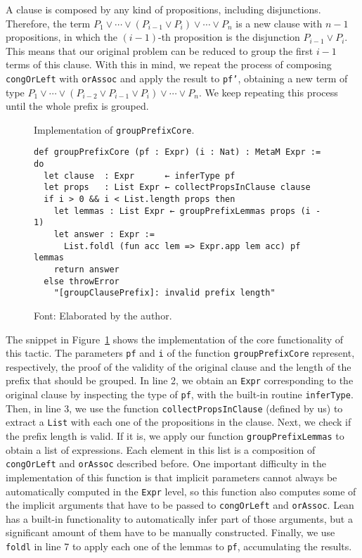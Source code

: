 A clause is composed by any kind of propositions, including disjunctions.
Therefore, the term $P_{1} \vee \cdots \vee (P_{i - 1} \vee P_{i}) \vee \cdots \vee P_{n}$ is a new clause
with $n - 1$ propositions, in which the $(i - 1)$-th proposition is the disjunction
$P_{i - 1} \vee P_{i}$. This means that our original problem can be reduced to
group the first $i - 1$ terms of this clause.
With this in mind, we repeat the process of composing \texttt{congOrLeft} with
\texttt{orAssoc} and apply the result to \texttt{pf'}, obtaining
a new term of type $P_{1} \vee \cdots \vee (P_{i - 2} \vee P_{i - 1} \vee P_{i}) \vee \cdots \vee P_{n}$.
We keep repeating this process until the whole prefix is grouped.


\begin{figure}[t]
\caption{Implementation of \texttt{groupPrefixCore}.}\label{groupClause}
\begin{verbatim}
def groupPrefixCore (pf : Expr) (i : Nat) : MetaM Expr := do
  let clause  : Expr      ← inferType pf
  let props   : List Expr ← collectPropsInClause clause
  if i > 0 && i < List.length props then
    let lemmas : List Expr ← groupPrefixLemmas props (i - 1)
    let answer : Expr :=
      List.foldl (fun acc lem => Expr.app lem acc) pf lemmas
    return answer
  else throwError
    "[groupClausePrefix]: invalid prefix length"
\end{verbatim}
\caption*{Font: Elaborated by the author.}
\end{figure}

The snippet in Figure~\ref{groupClause} shows the
implementation of the core functionality of this tactic.
The parameters \texttt{pf} and \texttt{i} of the function \texttt{groupPrefixCore}
represent, respectively, the proof of the validity of the original clause
and the length of the prefix that should be grouped. In line 2, we obtain
an \texttt{Expr} corresponding to the original clause by inspecting the type
of \texttt{pf}, with the built-in routine \texttt{inferType}. Then, in line 3,
we use the function \texttt{collectPropsInClause} (defined by us) to
extract a \texttt{List} with each one of the propositions in the clause.
Next, we check if the prefix length is valid. If it is, we apply our function
\texttt{groupPrefixLemmas} to obtain a list of expressions. Each element in this list
is a composition of \texttt{congOrLeft} and \texttt{orAssoc} described before.
One important difficulty in the implementation of this function is that implicit parameters cannot always be automatically computed in the \texttt{Expr} level, so
this function also computes some of the implicit arguments that have to be
passed to \texttt{congOrLeft} and \texttt{orAssoc}. Lean has a built-in
functionality to automatically infer part of those arguments, but a significant
amount of them have to be manually constructed.
Finally, we use \texttt{foldl}
in line 7 to apply each one of the lemmas to \texttt{pf}, accumulating the results.

